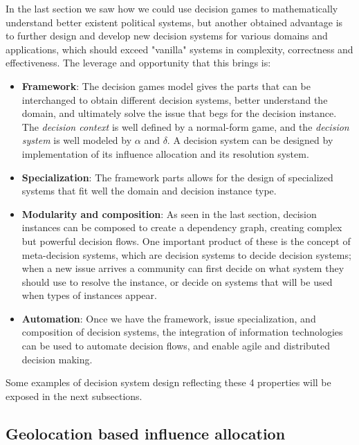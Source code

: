 In the last section we saw how we could use decision games to mathematically understand better existent political systems, but another obtained advantage is to further design and develop new decision systems for various domains and applications, which should exceed "vanilla" systems in complexity, correctness and effectiveness. The leverage and opportunity that this brings is:

\begin{itemize}
  \item \textbf{Framework}: The decision games model gives the parts that can be interchanged to obtain different decision systems, better understand the domain, and ultimately solve the issue that begs for the decision instance. The \textit{decision context} is well defined by a normal-form game, and the \textit{decision system} is well modeled by $\alpha$ and $\delta$. A decision system can be designed by implementation of its influence allocation and its resolution system. 
  
  \item \textbf{Specialization}: The framework parts allows for the design of specialized systems that fit well the domain and decision instance type.
  
  \item \textbf{Modularity and composition}: As seen in the last section, decision instances can be composed to create a dependency graph, creating complex but powerful decision flows. One important product of these is the concept of meta-decision systems, which are decision systems to decide decision systems; when a new issue arrives a community can first decide on what system they should use to resolve the instance, or decide on systems that will be used when types of instances appear.
  
  \item \textbf{Automation}: Once we have the framework, issue specialization, and composition of decision systems, the integration of information technologies can be used to automate decision flows, and enable agile and distributed decision making.
\end{itemize}

Some examples of decision system design reflecting these 4 properties will be exposed in the next subsections.

\subsection{Geolocation based influence allocation}

